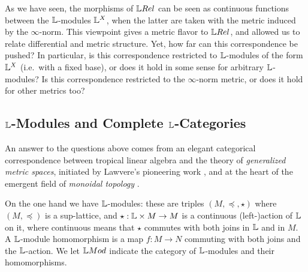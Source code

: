 

As we have seen, the morphisms of $\LREL$ can be seen as continuous functions between the $\mathbb{L}$-modules $\mathbb{L}^{X}$, when the latter are taken with the metric induced by the $\infty$-norm. This viewpoint gives a metric flavor to $\LREL$, and allowed us to relate differential and metric structure. Yet, how far can this correspondence be pushed?
In particular, is this correspondence restricted to $\mathbb{L}$-modules of the form $\mathbb{L}^{X}$ (i.e.~with a fixed base), or does it hold in some sense for arbitrary $\mathbb{L}$-modules? Is this correspondence restricted to the $\infty$-norm metric, or does it hold for other metrics too?

\subsection{$\mathbb{L}$-Modules and Complete $\mathbb{L}$-Categories}

An answer to the questions above comes from an elegant categorical correspondence between tropical linear algebra and the theory of \emph{generalized metric spaces}, initiated by Lawvere's pioneering work \cite{Lawvere1973}, and at the heart of the emergent field of \emph{monoidal topology} \cite{Hofmann2014, Stubbe2014}.

 
%
%
%


On the one hand we have $\mathbb{L}$-modules: these are triples $(M,\preceq, \star)$ where $(M, \preceq)$ is a sup-lattice, and $\star: \mathbb{L} \times M \to M$ is a continuous (left-)action of $\mathbb{L}$ on it, where continuous means that $\star$ commutes with both joins in $\mathbb{L}$ and in $M$. %
A $\mathbb{L}$-module homomorphism is a map $f:M\to N$ commuting with both joins and the $\mathbb{L}$-action. We let $\Mod$ indicate the category of $\mathbb{L}$-modules and their homomorphisms. 
 
